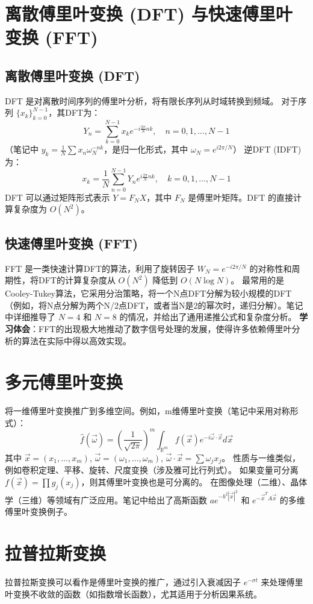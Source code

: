 \documentclass[UTF8]{ctexart}
\begin{document}
	
	\section{离散傅里叶变换 (DFT) 与快速傅里叶变换 (FFT)}
	\subsection{离散傅里叶变换 (DFT)}
	DFT 是对离散时间序列的傅里叶分析，将有限长序列从时域转换到频域。
	对于序列 $\{x_k\}_{k=0}^{N-1}$，其DFT为：
	\[ Y_n = \sum_{k=0}^{N-1} x_k e^{-i \frac{2\pi}{N} nk}, \quad n=0, 1, \dots, N-1 \]
	（笔记中 $y_k = \frac{1}{N}\sum x_n \omega_N^{-nk}$，是归一化形式，其中 $\omega_N = e^{i2\pi/N}$）
	逆DFT (IDFT) 为：
	\[ x_k = \frac{1}{N} \sum_{n=0}^{N-1} Y_n e^{i \frac{2\pi}{N} nk}, \quad k=0, 1, \dots, N-1 \]
	DFT 可以通过矩阵形式表示 $Y = F_N X$，其中 $F_N$ 是傅里叶矩阵。DFT 的直接计算复杂度为 $O(N^2)$。
	
	\subsection{快速傅里叶变换 (FFT)}
	FFT 是一类快速计算DFT的算法，利用了旋转因子 $W_N = e^{-i2\pi/N}$ 的对称性和周期性，将DFT的计算复杂度从 $O(N^2)$ 降低到 $O(N \log N)$。
	最常用的是Cooley-Tukey算法，它采用分治策略，将一个N点DFT分解为较小规模的DFT（例如，将N点分解为两个N/2点DFT，或者当N是2的幂次时，递归分解）。笔记中详细推导了 $N=4$ 和 $N=8$ 的情况，并给出了通用递推公式和复杂度分析。
	\textbf{学习体会}：FFT的出现极大地推动了数字信号处理的发展，使得许多依赖傅里叶分析的算法在实际中得以高效实现。
	
	\section{多元傅里叶变换}
	将一维傅里叶变换推广到多维空间。例如，m维傅里叶变换（笔记中采用对称形式）：
	\[ \hat{f}(\vec{\omega}) = \left(\frac{1}{\sqrt{2\pi}}\right)^m \int_{\mathbb{R}^m} f(\vec{x}) e^{-i\vec{\omega}\cdot\vec{x}} d\vec{x} \]
	其中 $\vec{x}=(x_1, \dots, x_m)$, $\vec{\omega}=(\omega_1, \dots, \omega_m)$, $\vec{\omega}\cdot\vec{x} = \sum \omega_j x_j$。
	性质与一维类似，例如卷积定理、平移、旋转、尺度变换（涉及雅可比行列式）。
	如果变量可分离 $f(\vec{x}) = \prod g_j(x_j)$，则其傅里叶变换也是可分离的。
	在图像处理（二维）、晶体学（三维）等领域有广泛应用。笔记中给出了高斯函数 $ae^{-b^2|\vec{x}|^2}$ 和 $e^{-\vec{x}^T A \vec{x}}$ 的多维傅里叶变换例子。
	

	
	\section{拉普拉斯变换}
	拉普拉斯变换可以看作是傅里叶变换的推广，通过引入衰减因子 $e^{-\sigma t}$ 来处理傅里叶变换不收敛的函数（如指数增长函数），尤其适用于分析因果系统。
	
\end{document}

